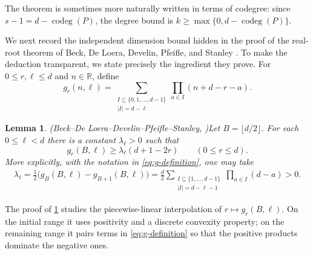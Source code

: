 \documentclass[reqno, 12pt]{article}
\numberwithin{equation}{section}
\newtheorem{lemma}[theorem]{Lemma}
\theoremstyle{definition}
\newcommand{\R}{\mathbb{R}}
\newcommand{\codeg}{\operatorname{codeg}}
\begin{document}
The theorem is sometimes more naturally written in terms of codegree:
since $s-1=d-\codeg(P)$, the degree bound is
$k\geq\max\{0,d-\codeg(P)\}$.

We next record the independent dimension bound hidden in the proof of the real-root theorem of Beck, De Loera, Develin, Pfeifle, and Stanley \cite{BeckEtAl2005}.  To make the deduction transparent, we state precisely the ingredient they prove.
For $0\leq r,\ell\leq d$ and $n\in\R$, define
\begin{equation}\label{eq:g-definition}
g_r(n,\ell)=\sum_{\substack{I\subseteq\{0,1,\ldots,d-1\}\\|I|=d-\ell}}\prod_{a\in I}(n+d-r-a).
\end{equation}

\begin{lemma}{\em (Beck--De Loera--Develin--Pfeifle--Stanley, \cite[Lemmas~4.5--4.6]{BeckEtAl2005})}\label{lem:beck}
Let $B=\lfloor d/2\rfloor$.  For each
$0\leq\ell<d$ there is a
constant $\lambda_\ell>0$ such that
\begin{equation}\label{eq:beck-inequality}
  g_r(B,\ell)\geq\lambda_\ell(d+1-2r)\qquad(0\leq r\leq d).
\end{equation}
More explicitly, with the notation in \eqref{eq:g-definition}, one may
take
\begin{align}
 \lambda_\ell=\frac12\bigl(g_B(B,\ell)-g_{B+1}(B,\ell)\bigr)
 =\frac d2\sum_{\substack{I\subseteq\{1,\ldots,d-1\}\\|I|=d-\ell-1}}\prod_{a\in I}(d-a)>0.
\end{align}
\end{lemma}

The proof of \cref{lem:beck} studies the piecewise-linear interpolation of $r\mapsto g_r(B,\ell)$.  On the initial range it uses positivity and a discrete convexity property; on the remaining range it pairs terms in \eqref{eq:g-definition} so that the positive products dominate the negative ones. 
\end{document}
